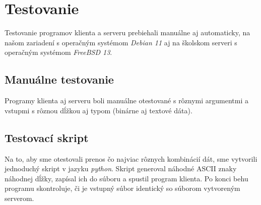\documentclass[a4paper]{article}
\begin{document}
  \section{Testovanie}

  Testovanie programov klienta a serveru prebiehali manuálne aj automaticky,
  na našom zariadení s operačným systémom \textit{Debian 11} aj na školskom
  serveri s operačným systémom \textit{FreeBSD 13}.


  \subsection{Manuálne testovanie}

  Programy klienta aj serveru boli manuálne otestované s rôznymi argumentmi a 
  vstupmi s rôznou dĺžkou aj typom (binárne aj textové dáta).


  \subsection{Testovací skript}

  Na to, aby sme otestovali prenos čo najviac rôznych kombinácií dát, sme
  vytvorili jednoduchý skript v jazyku \textit{python}. Skript generoval
  náhodné ASCII znaky náhodnej dĺžky, zapísal ich do súboru a spustil program
  klienta. Po konci behu programu skontroluje, či je vstupný súbor identický
  so súborom vytvoreným serverom.
\end{document}
